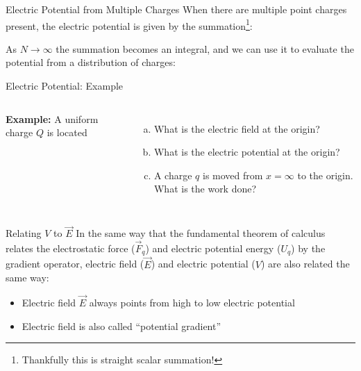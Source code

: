 \documentclass[12pt,aspectratio=169]{beamer}
\begin{document}
\begin{frame}{Electric Potential from Multiple Charges}
  When there are multiple point charges present, the electric potential is
  given by the summation\footnote{Thankfully this is straight scalar
  summation!}:


  As $N\rightarrow\infty$ the summation becomes an integral, and we can use it
  to evaluate the potential from a distribution of charges:

  \vspace{.3in}
\end{frame}




\begin{frame}{Electric Potential: Example}
  \begin{columns}
    
    \textbf{Example:} A uniform charge $Q$ is located

    \begin{enumerate}[(a)]
    \item What is the electric field at the origin?
    \item What is the electric potential at the origin?
    \item A charge $q$ is moved from $x=\infty$ to the origin. What is the
      work done?
    \end{enumerate}
  \end{columns}
\end{frame}



\begin{frame}{Relating $V$ to $\vec E$}
  In the same way that the fundamental theorem of calculus relates the 
  electrostatic force ($\vec F_q$) and electric potential energy ($U_q$) by the
  gradient operator, electric field ($\vec E$) and electric potential ($V$) are
  also related the same way:

  \begin{itemize}
  \item Electric field $\vec E$ always points from high to low electric
    potential
  \item Electric field is also called ``potential gradient''
  \end{itemize}
\end{frame}
\end{document}

